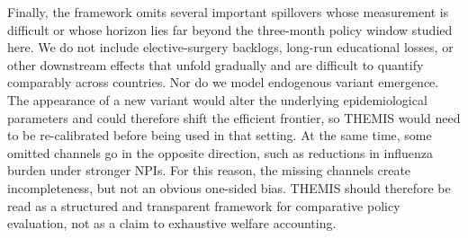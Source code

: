 \documentclass[msom,blindrev]{informs3} %
\begin{document}
{Finally, the framework omits several important spillovers whose measurement is difficult or whose horizon lies far beyond the three-month policy window studied here. We do not include elective-surgery backlogs, long-run educational losses, or other downstream effects that unfold gradually and are difficult to quantify comparably across countries. Nor do we model endogenous variant emergence. The appearance of a new variant would alter the underlying epidemiological parameters and could therefore shift the efficient frontier, so THEMIS would need to be re-calibrated before being used in that setting. At the same time, some omitted channels go in the opposite direction, such as reductions in influenza burden under stronger NPIs. For this reason, the missing channels create incompleteness, but not an obvious one-sided bias. THEMIS should therefore be read as a structured and transparent framework for comparative policy evaluation, not as a claim to exhaustive welfare accounting.}
\end{document}
